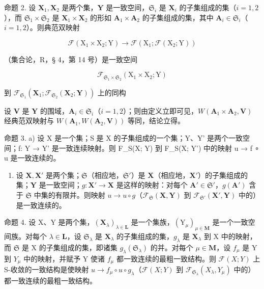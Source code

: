 命题 2. 设 \(\mathbf{X}_1, \mathbf{X}_2\) 是两个集，\(\mathbf{Y}\) 是一致空间，\(\mathfrak{S}_i\) 是 \(\mathbf{X}_i\) 的子集组成的集（\(i = 1, 2\)），而 \(\mathfrak{S}_1 \times \mathfrak{S}_2\) 是 \(\mathbf{X}_1 \times \mathbf{X}_2\) 的形如 \(\mathbf{A}_1 \times \mathbf{A}_2\) 的子集组成的集，其中 \(\mathbf{A}_i \in \mathfrak{S}_i\)（\(i = 1, 2\)）。则典范双映射

\[
\mathscr {F} \left(\mathrm{X} _ {1} \times \mathrm{X} _ {2}; \mathrm{Y}\right)\rightarrow \mathscr {F} \left(\mathrm{X} _ {1}; \mathscr {F} \left(\mathrm{X} _ {2}; \mathrm{Y}\right)\right)
\]

（集合论，R，§ 4，第 14 号）是一致空间

\[
\mathcal {F} _ {\mathfrak {S} _ {1} \times \mathfrak {S} _ {2}} (\mathrm{X} _ {1} \times \mathrm{X} _ {2}; \mathrm{Y})
\]

到 \(\mathcal{F}_{\mathfrak{S}_1}(\mathbf{X}_1;\mathcal{F}_{\mathfrak{S}_2}(\mathbf{X}_2;\mathbf{Y}))\) 上的同构

设 \(\mathbf{V}\) 是 \(\mathbf{Y}\) 的围域，\(\mathbf{A}_i\in \mathfrak{S}_i\)（\(i = 1,2\)）；则由定义立即可见，\(W(\mathbf{A}_1\times \mathbf{A}_2,\mathbf{V})\) 经典范双映射与 \(W(\mathbf{A}_1,W(\mathbf{A}_2,\mathbf{V}))\) 等同，结论立得。

命题 3. a) 设 X 是一个集；S 是 X 的子集组成的一个集；Y、Y' 是两个一致空间；f: Y → Y' 是一致连续映射。则 F\_S(X; Y) 到 F\_S(X; Y') 中的映射 u → f ∘ u 是一致连续的。

\begin{enumerate}
\def\labelenumi{\alph{enumi})}
\setcounter{enumi}{1}
\tightlist
\item
  设 \(\mathbf{X}, \mathbf{X}'\) 是两个集；\(\mathfrak{S}\)（相应地，\(\mathfrak{S}'\)）是 \(\mathbf{X}\)（相应地，\(\mathbf{X}'\)）的子集组成的集；\(\mathbf{Y}\) 是一致空间；\(g: \mathbf{X}' \to \mathbf{X}\) 是这样的映射：对每个 \(\mathbf{A}' \in \mathfrak{S}'\)，\(g(\mathbf{A}')\) 含于 \(\mathfrak{S}\) 中集的有限并。则映射 \(u \to u \circ g\)（\(\mathcal{F}_{\mathfrak{S}}(\mathbf{X}, \mathbf{Y})\) 到 \(\mathcal{F}_{\mathfrak{S}'}(\mathbf{X}', \mathbf{Y})\) 中的）是一致连续的。
\end{enumerate}

命题 4. 设 X、Y 是两个集，\((\mathbf{X}_{\lambda})_{\lambda \in \mathbf{L}}\) 是一个集族，\((\mathrm{Y}_{\mu})_{\mu \in \mathbf{M}}\) 是一个一致空间族。对每个 \(\lambda \in \mathbf{L}\)，设 \(\mathfrak{S}_{\lambda}\) 是 \(\mathbf{X}_{\lambda}\) 的子集组成的集，\(g_{\lambda}\) 是 \(\mathbf{X}_{\lambda}\) 到 X 中的映射，而 \(\mathfrak{S}\) 是 X 的子集组成的集，即诸集 \(g_{\lambda}(\mathfrak{S}_{\lambda})\) 的并。对每个 \(\mu \in \mathbf{M}\)，设 \(f_{\mu}\) 是 Y 到 \(Y_{\mu}\) 中的映射，并赋予 Y 使诸 \(f_{\mu}\) 都一致连续的最粗一致结构。则 \(\mathcal{F}(X;Y)\) 上 S-收敛的一致结构是使映射 \(u \to f_{\mu} \circ u \circ g_{\lambda}\)（\(\mathcal{F}(X;Y)\) 到 \(\mathcal{F}_{\mathfrak{S}_{\lambda}}(X_{\lambda},Y_{\mu})\) 中的）都一致连续的最粗一致结构。

